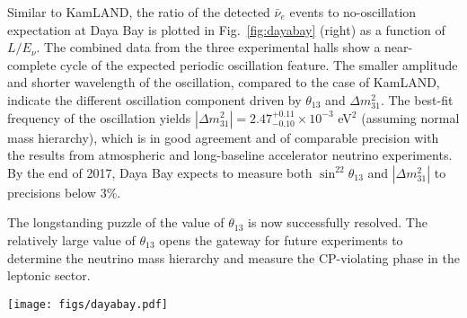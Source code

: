 Similar to KamLAND, the ratio of the detected $\bar\nu_{e}$ events to no-oscillation expectation at Daya Bay is plotted in Fig.~\ref{fig:dayabay} (right) as a function of $L/E_{\nu}$. 
The combined data from the three experimental halls show a near-complete cycle of the expected periodic oscillation feature. 
The smaller amplitude and shorter wavelength of the oscillation, compared to the case of KamLAND, indicate the different oscillation component driven by $\theta_{13}$ and $\Delta{m}^2_{31}$. 
The best-fit frequency of the oscillation yields $|\Delta{m}^2_{31}| = 2.47^{+0.11}_{-0.10} \times 10^{-3}$ eV$^2$ (assuming normal mass hierarchy), which is in good agreement and of comparable precision with the results from atmospheric and long-baseline accelerator neutrino experiments. 
By the end of 2017, Daya Bay expects to measure both $\sin^22\theta_{13}$ and $|\Delta{m}^2_{31}|$ to precisions below 3\%.

The longstanding puzzle of the value of $\theta_{13}$ is now successfully resolved.
The relatively large value of $\theta_{13}$ opens the gateway for future experiments to determine the neutrino mass hierarchy and measure the CP-violating phase in the leptonic sector.

\begin{figure*}[htb] \label{fig:dayabay}
  \centering
  \texttt{[image: figs/dayabay.pdf]}
  \caption{{\bf Daya Bay results}~\cite{Zhang-Neutrino14}: (left) Ratio of the detected to expected $\bar\nu_{e}$ signals at the 8 antineutrino detectors (ADs) located in three experimental halls as a function of effective baseline. The oscillation survival probability at the best-fit value is given by the red curve.
  (right) Ratio of the background-subtracted $\bar\nu_e$ spectrum to the expectation for no-oscillation in the three experimental halls, re-expressed as a function of $L_{\textrm{eff}}/E_{\nu}$. The effective baseline $L_{\textrm{eff}}$ is determined for each experimental hall (EH) to an effective oscillated flux from a single baseline. The oscillation survival probability using the best estimates of $\theta_{13}$ and $|\Delta{m}^2_{31}|$ is given by the red curve.}
\end{figure*}





